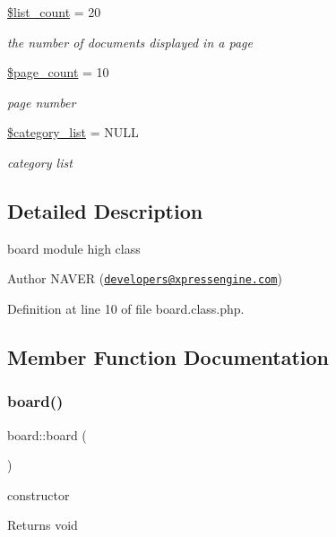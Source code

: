 \begin{DoxyCompactItemize}
\hyperlink{classboard_ab66c6932a082c110ebd921c0be8d6788}{\$list\+\_\+count} = 20
\begin{DoxyCompactList}\small\item\em the number of documents displayed in a page \end{DoxyCompactList}\item 
\hyperlink{classboard_ab5d2d3925f753039483da2c65076122b}{\$page\+\_\+count} = 10
\begin{DoxyCompactList}\small\item\em page number \end{DoxyCompactList}\item 
\hyperlink{classboard_aee8ebe65314796fea517f8f7875a4b8f}{\$category\+\_\+list} = N\+U\+LL
\begin{DoxyCompactList}\small\item\em category list \end{DoxyCompactList}\end{DoxyCompactItemize}


\subsection{Detailed Description}
board module high class 

\begin{DoxyAuthor}{Author}
N\+A\+V\+ER (\href{mailto:developers@xpressengine.com}{\tt developers@xpressengine.\+com}) 
\end{DoxyAuthor}


Definition at line 10 of file board.\+class.\+php.



\subsection{Member Function Documentation}
\hypertarget{classboard_a2a97f34e7c9ed8ace6a2508bb2c6e2a2}{}\label{classboard_a2a97f34e7c9ed8ace6a2508bb2c6e2a2} 
\subsubsection{\texorpdfstring{board()}{board()}}
{\footnotesize\ttfamily board\+::board (\begin{DoxyParamCaption}{ }\end{DoxyParamCaption})}

constructor

\begin{DoxyReturn}{Returns}
void 
\end{DoxyReturn}


